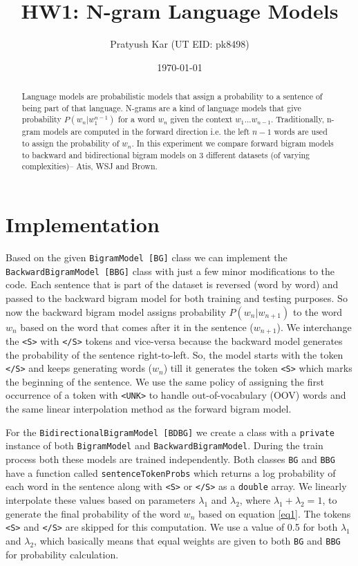 \documentclass[a4paper]{article}
\title{HW1: N-gram Language Models}
\author{Pratyush Kar (UT EID: pk8498)}
\date{\today}
\newcommand{\code}[1]{\texttt{#1}}
\begin{document}
\maketitle

\begin{abstract}
Language models are probabilistic models that assign a probability to a sentence of being part of that language. N-grams are a kind of language models that give probability $P(w_n | w_1^{n-1})$ for a word $w_n$ given the context $w_1 ... w_{n-1}$. Traditionally, n-gram models are computed in the forward direction i.e. the left $n - 1$ words are used to assign the probability of $w_n$. In this experiment we compare forward bigram models to backward and bidirectional bigram models on 3 different datasets (of varying complexities)-- Atis, WSJ and Brown.
\end{abstract}

\section{Implementation}
\label{sec:implemetation}

Based on the given \code{BigramModel [BG]} class we can implement the \code{BackwardBigramModel [BBG]} class with just a few minor modifications to the code. Each sentence that is part of the dataset is reversed (word by word) and passed to the backward bigram model for both training and testing purposes. So now the backward bigram model assigns probability $P(w_n | w_{n + 1})$ to the word $w_n$ based on the word that comes after it in the sentence ($w_{n + 1}$). We interchange the \code{<S>} with \code{</S>} tokens and vice-versa because the backward model generates the probability of the sentence right-to-left. So, the model starts with the token \code{</S>} and keeps generating words ($w_n$) till it generates the token \code{<S>} which marks the beginning of the sentence. We use the same policy of assigning the first occurrence of a token with \code{<UNK>} to handle out-of-vocabulary (OOV) words and the same linear interpolation method as the forward bigram model.

For the \code{BidirectionalBigramModel [BDBG]} we create a class with a \code{private} instance of both \code{BigramModel} and \code{BackwardBigramModel}. During the train process both these models are trained independently. Both classes \code{BG} and \code{BBG} have a function called \code{sentenceTokenProbs} which returns a log probability of each word in the sentence along with \code{<S>} or \code{</S>} as a \code{double} array. We linearly interpolate these values based on parameters $\lambda_1$ and $\lambda_2$, where $\lambda_1 + \lambda_2 = 1$, to generate the final probability of the word $w_n$ based on equation \ref{eq1}. The tokens \code{<S>} and \code{</S>} are skipped for this computation. We use a value of 0.5 for both $\lambda_1$ and $\lambda_2$, which basically means that equal weights are given to both \code{BG} and \code{BBG} for probability calculation.
\end{document}
